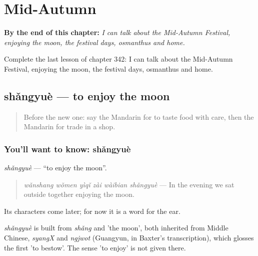 
\chapter{Mid-Autumn}
\label{ch:zh-mid-autumn}

\begin{chapteropening}
\textbf{By the end of this chapter:} \emph{I can talk about the Mid-Autumn Festival, enjoying the moon, the festival days, osmanthus and home.}

Complete the last lesson of chapter 342: I can talk about the Mid-Autumn Festival, enjoying the moon, the festival days, osmanthus and home.
\end{chapteropening}

\section[shǎngyuè]{shǎngyuè — to enjoy the moon}

\label{lesson:ZH-C342-shangyue}



\begin{quote}
Before the new one: say the Mandarin for to taste food with care, then the Mandarin for trade in a shop.
\end{quote}

\subsection*{You'll want to know: shǎngyuè}
\emph{shǎngyuè} — \textquotedblleft{}to enjoy the moon\textquotedblright{}.

\begin{quote}
\emph{wǎnshang wǒmen yìqǐ zài wàibian shǎngyuè} — In the evening we sat outside together enjoying the moon.
\end{quote}

Its characters come later; for now it is a word for the ear.

\begin{cousinweb}
\emph{shǎngyuè} is built from \emph{shǎng} and  'the moon', both inherited from Middle Chinese, \emph{syangX} and \emph{ngjwot} (Guangyun, in Baxter's transcription), which glosses the first 'to bestow'. The sense 'to enjoy' is not given there.
\end{cousinweb}

